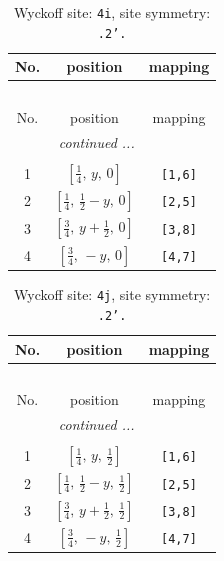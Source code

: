 \documentclass[fleqn,8pt]{jsarticle}
\begin{document}
\renewcommand{\arraystretch}{1.2}
\begin{longtable}{ccc}
\caption{Wyckoff site: {\tt 4i}, site symmetry: {\tt .2'.}}
 \\
 \hline \hline
No. & position & mapping \\ \hline \endfirsthead

\multicolumn{2}{l}{\tablename\ \thetable{}} \\
 \hline \hline
No. & position & mapping \\ \hline \endhead

 \hline \hline
\multicolumn{2}{r}{\footnotesize\it continued ...} \\ \endfoot

 \hline \hline
\multicolumn{2}{r}{} \\ \endlastfoot

1 & $\left[ \frac{1}{4},\, y,\, 0 \right]$ & {\tt [1,6]} \\ \hline
2 & $\left[ \frac{1}{4},\, \frac{1}{2} - y,\, 0 \right]$ & {\tt [2,5]} \\ \hline
3 & $\left[ \frac{3}{4},\, y + \frac{1}{2},\, 0 \right]$ & {\tt [3,8]} \\ \hline
4 & $\left[ \frac{3}{4},\, - y,\, 0 \right]$ & {\tt [4,7]} \\
\end{longtable}
\renewcommand{\arraystretch}{1.2}
\begin{longtable}{ccc}
\caption{Wyckoff site: {\tt 4j}, site symmetry: {\tt .2'.}}
 \\
 \hline \hline
No. & position & mapping \\ \hline \endfirsthead

\multicolumn{2}{l}{\tablename\ \thetable{}} \\
 \hline \hline
No. & position & mapping \\ \hline \endhead

 \hline \hline
\multicolumn{2}{r}{\footnotesize\it continued ...} \\ \endfoot

 \hline \hline
\multicolumn{2}{r}{} \\ \endlastfoot

1 & $\left[ \frac{1}{4},\, y,\, \frac{1}{2} \right]$ & {\tt [1,6]} \\ \hline
2 & $\left[ \frac{1}{4},\, \frac{1}{2} - y,\, \frac{1}{2} \right]$ & {\tt [2,5]} \\ \hline
3 & $\left[ \frac{3}{4},\, y + \frac{1}{2},\, \frac{1}{2} \right]$ & {\tt [3,8]} \\ \hline
4 & $\left[ \frac{3}{4},\, - y,\, \frac{1}{2} \right]$ & {\tt [4,7]} \\
\end{longtable}
\end{document}
